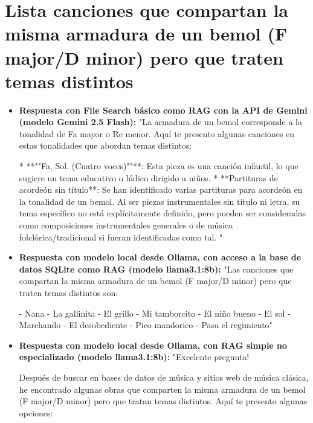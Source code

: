 \section{Lista canciones que compartan la misma armadura de un bemol (F major/D minor) pero que traten temas distintos}
\begin{itemize}
    \item \textbf{Respuesta con File Search básico como RAG con la API de Gemini (modelo Gemini 2.5 Flash):} "La armadura de un bemol corresponde a la tonalidad de Fa mayor o Re menor. Aquí te presento algunas canciones en estas tonalidades que abordan temas distintos:

*   **""Fa, Sol. (Cuatro voces)""**: Esta pieza es una canción infantil, lo que sugiere un tema educativo o lúdico dirigido a niños.
*   **Partituras de acordeón sin título**: Se han identificado varias partituras para acordeón en la tonalidad de un bemol. Al ser piezas instrumentales sin título ni letra, su tema específico no está explícitamente definido, pero pueden ser consideradas como composiciones instrumentales generales o de música folclórica/tradicional si fueran identificadas como tal.
"
    \item \textbf{Respuesta con modelo local desde Ollama, con acceso a la base de datos SQLite como RAG (modelo llama3.1:8b):} "Las canciones que compartan la misma armadura de un bemol (F major/D minor) pero que traten temas distintos son:

- Nana
- La gallinita
- El grillo
- Mi tamborcito
- El niño bueno
- El sol
- Marchando
- El desobediente
- Pico mandorico
- Pasa el regimiento"
\item \textbf{Respuesta con modelo local desde Ollama, con RAG simple no especializado (modelo llama3.1:8b):} "Excelente pregunta!

Después de buscar en bases de datos de música y sitios web de música clásica, he encontrado algunas obras que comparten la misma armadura de un bemol (F major/D minor) pero que tratan temas distintos. Aquí te presento algunas opciones:


\end{itemize}
